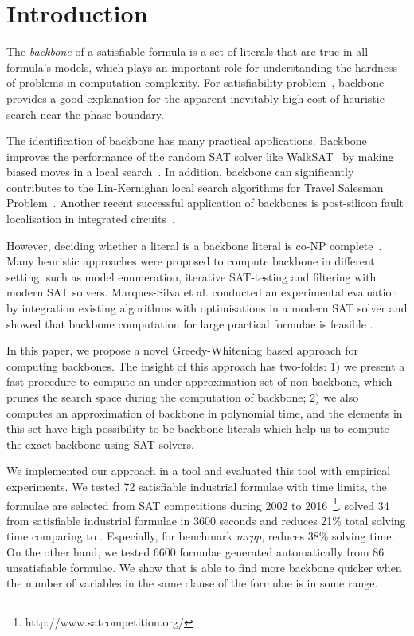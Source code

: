 

\section{Introduction}
The \textit{backbone} of a satisfiable formula is a set of literals that are true in all formula's models,
which plays an important role for understanding the hardness of problems in computation complexity.
For satisfiability problem~\cite{MZKST99},  backbone provides a good explanation for the apparent inevitably high cost of heuristic search near the phase boundary.

The identification of backbone  has many practical applications. Backbone improves the performance of the random SAT solver like  WalkSAT~\cite{SBK1993} by making biased moves in a local search~\cite{ZWR2003,MAR2007}. In addition, backbone can significantly contributes to the Lin-Kernighan local search algorithms for Travel Salesman Problem~\cite{ZWL2005}. Another recent successful application of backbones is post-silicon fault localisation in integrated circuits~\cite{ZWSM11,ZWM11}.

However, deciding whether a literal is a backbone literal is co-NP complete~\cite{Jan10}. Many heuristic approaches were proposed to compute backbone in different setting, such as model enumeration, iterative SAT-testing and filtering with modern SAT solvers.
Marques-Silva et al. conducted an experimental evaluation by integration existing algorithms with optimisations in a modern SAT solver and showed that backbone computation for large practical formulae is feasible \cite{MJML2010,JLMS12,JLM15}.


In this paper, we propose a novel Greedy-Whitening based approach \tool for computing backbones. The insight of this approach has two-folds: 1) we present a fast procedure to compute an under-approximation set of non-backbone, which prunes the search space during the computation of backbone; 2) we also computes an approximation of backbone in polynomial time, and the elements in this set have high possibility to be  backbone literals which help us to  compute the exact backbone using SAT solvers.

We implemented our approach in a tool \tool and evaluated this tool with empirical experiments. We tested 72 satisfiable industrial formulae with time limits, the formulae are selected from SAT competitions during 2002 to 2016~\footnote{http://www.satcompetition.org/}.  \tool solved 34 from satisfiable industrial formulae in 3600 seconds and reduces 21\% total solving time comparing to \minibones. Especially, for benchmark \textit{mrpp}, \tool reduces 38\% solving time. On the other hand, we tested  6600 formulae generated automatically from 86 unsatisfiable formulae. We show that \tool is able to find more backbone quicker when the number of variables in the same clause of the formulae is in some range.
